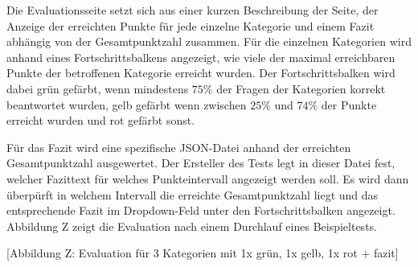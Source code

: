 Die Evaluationsseite setzt sich aus einer kurzen Beschreibung der Seite, der Anzeige der erreichten Punkte für jede einzelne Kategorie und einem Fazit abhängig von der Gesamtpunktzahl zusammen. Für die einzelnen Kategorien wird anhand eines Fortschrittsbalkens angezeigt, wie viele der maximal erreichbaren Punkte der betroffenen Kategorie erreicht wurden. Der Fortschrittsbalken wird dabei grün gefärbt, wenn mindestens $75\%$ der Fragen der Kategorien korrekt beantwortet wurden, gelb gefärbt wenn zwischen $25\%$ und $74\%$ der Punkte erreicht wurden und rot gefärbt sonst.

Für das Fazit wird eine spezifische JSON-Datei anhand der erreichten Gesamtpunktzahl ausgewertet. Der Ersteller des Tests legt in dieser Datei fest, welcher Fazittext für welches Punkteintervall angezeigt werden soll. Es wird dann überpürft in welchem Intervall die erreichte Gesamtpunktzahl liegt und das entsprechende Fazit im Dropdown-Feld unter den Fortschrittsbalken angezeigt. Abbildung Z zeigt die Evaluation nach einem Durchlauf eines Beispieltests. 

[Abbildung Z: Evaluation für 3 Kategorien mit 1x grün, 1x gelb, 1x rot + fazit]





